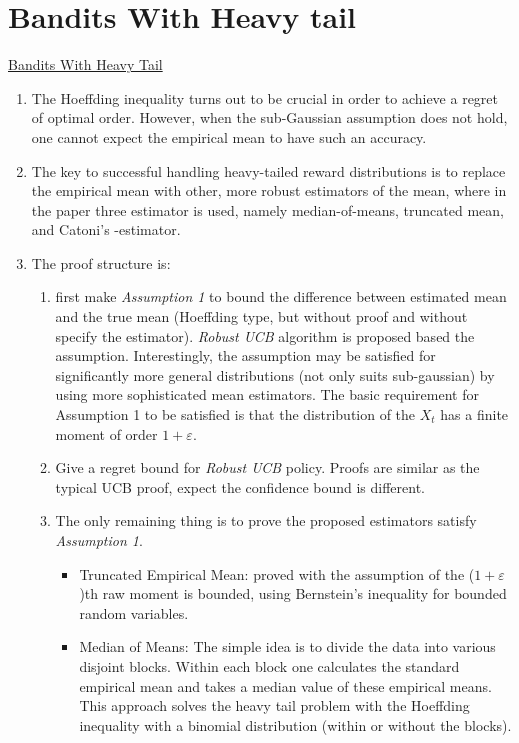 \documentclass{article}
\begin{document}
\section{Bandits With Heavy tail} 
\href{http://ieeexplore.ieee.org/document/6576820/}{Bandits With Heavy Tail}\cite{bubeck2013bandits}
\begin{enumerate}
    \item The Hoeffding inequality turns out to be crucial in
order to achieve a regret of optimal order. However, when the
sub-Gaussian assumption does not hold, one cannot expect the
empirical mean to have such an accuracy.
    \item The key to successful handling heavy-tailed reward distributions is to replace the empirical mean with other, more robust estimators of the mean, where in the paper three estimator is used, namely median-of-means, truncated mean, and Catoni’s -estimator.
    \item The proof structure is:
        \begin{enumerate}
            \item first make \textit{Assumption 1} to bound the difference between estimated mean and the true mean (Hoeffding type, but without proof and without specify the estimator). \textit{Robust UCB} algorithm is proposed based the assumption. Interestingly, the assumption may be satisfied for significantly more general distributions (not only suits sub-gaussian) by using more sophisticated mean estimators. The basic requirement for Assumption 1 to be satisfied is that the distribution of the $X_t$ has a finite moment of order $1 + \varepsilon$.
            \item Give a regret bound for \textit{Robust UCB} policy. Proofs are similar as the typical UCB proof, expect the confidence bound is different. 
            \item The only remaining thing is to prove the proposed estimators satisfy \textit{Assumption 1}. 
                \begin{itemize}
                    \item Truncated Empirical Mean: proved with the assumption of the ($1+ \varepsilon$)th raw moment is bounded, using Bernstein’s inequality for bounded random variables.
                    \item Median of Means: The simple idea is to divide the data into various disjoint blocks. Within each block one calculates the standard empirical mean and takes a median value of these empirical means. This approach solves the heavy tail problem with the Hoeffding inequality with a binomial distribution (within or without the blocks). 
                \end{itemize}
        \end{enumerate}
\end{enumerate}
\end{document}
